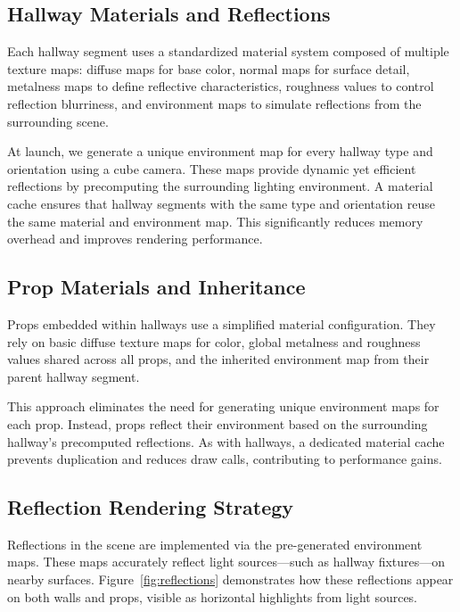 \documentclass{article}
\begin{document}
\subsection{Hallway Materials and Reflections}

Each hallway segment uses a standardized material system composed of multiple texture maps: diffuse maps for base color, normal maps for surface detail, metalness maps to define reflective characteristics, roughness values to control reflection blurriness, and environment maps to simulate reflections from the surrounding scene.

At launch, we generate a unique environment map for every hallway type and orientation using a cube camera. These maps provide dynamic yet efficient reflections by precomputing the surrounding lighting environment. A material cache ensures that hallway segments with the same type and orientation reuse the same material and environment map. This significantly reduces memory overhead and improves rendering performance.

\subsection{Prop Materials and Inheritance}

Props embedded within hallways use a simplified material configuration. They rely on basic diffuse texture maps for color, global metalness and roughness values shared across all props, and the inherited environment map from their parent hallway segment.

This approach eliminates the need for generating unique environment maps for each prop. Instead, props reflect their environment based on the surrounding hallway’s precomputed reflections. As with hallways, a dedicated material cache prevents duplication and reduces draw calls, contributing to performance gains.

\subsection{Reflection Rendering Strategy}

Reflections in the scene are implemented via the pre-generated environment maps. These maps accurately reflect light sources—such as hallway fixtures—on nearby surfaces. Figure~\ref{fig:reflections} demonstrates how these reflections appear on both walls and props, visible as horizontal highlights from light sources.
\end{document}
